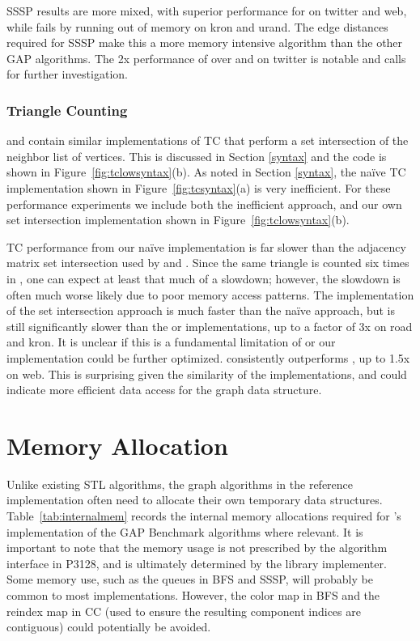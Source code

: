 SSSP results are more mixed, with superior performance for \bgl on twitter and web,
while \bgl fails by running out of memory on kron and urand.
The edge distances required for SSSP make this a more memory intensive algorithm
than the other GAP algorithms.
The 2x performance of \bgl over \nwgraph and \stdgraph on twitter is notable and calls for further
investigation.

\subsubsection{Triangle Counting}

\nwgraph and \stdgraph contain similar implementations of TC 
that perform a set intersection of the neighbor list of vertices.
This is discussed in Section \ref{syntax} and the \stdgraph code is shown
in Figure~\ref{fig:tclowsyntax}(b).
As noted in Section \ref{syntax}, the na\"ive \bgl TC implementation shown in Figure~\ref{fig:tcsyntax}(a) is very inefficient.
For these performance experiments we include both the inefficient \bgl approach, and our own
\bgl set intersection implementation shown in Figure~\ref{fig:tclowsyntax}(b).

TC performance from our na\"ive \bgl implementation
is far slower than the adjacency matrix set intersection used by \nwgraph
and \stdgraph.
Since the same triangle is counted six times in \bgl,
one can expect at least that much of a slowdown; however, the slowdown
is often much worse likely due to poor memory access patterns.
The \bgl implementation of the set intersection approach is much faster
than the na\"ive approach, but is still significantly slower than the
\nwgraph or \stdgraph implementations, up to a factor of 3x on road and kron.
It is unclear if this is a fundamental limitation of \bgl or our implementation could be
further optimized.
\stdgraph consistently outperforms \nwgraph, up to 1.5x on web.
This is surprising given the similarity of the implementations, and could indicate more
efficient data access for the \stdgraph graph data structure.

\section{Memory Allocation}

Unlike existing STL algorithms, the graph algorithms in the \stdgraph reference
implementation often need to allocate their own temporary data structures.
Table~\ref{tab:internalmem} records the internal memory allocations
required for \stdgraph's implementation of the GAP Benchmark algorithms
where relevant.
It is important to note that the memory usage is not prescribed
by the algorithm interface in P3128, and is ultimately determined by the
library implementer.
Some memory use, such as the queues in BFS and SSSP, will
probably be common to most implementations.
However, the color map in BFS and the reindex map in CC
(used to ensure the resulting component indices are contiguous)
could potentially be avoided.

